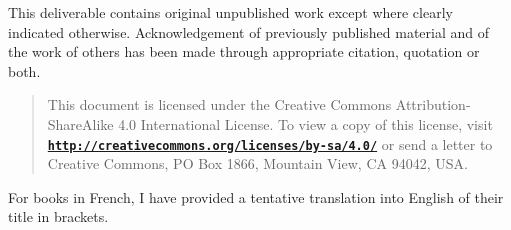 \documentclass[11pt,a4paper]{article}
\newcommand{\bmurl}[1]{{\href{#1}{\texttt{\textbf{#1}}}}}
\begin{document}
This deliverable contains original unpublished work except where
clearly indicated otherwise. Acknowledgement of previously published
material and of the work of others has been made through appropriate
citation, quotation or both.




\begin{quote}
{\footnotesize {} This document
is licensed under the Creative Commons Attribution-ShareAlike 4.0
International License. To view a copy of this license, visit
\bmurl{http://creativecommons.org/licenses/by-sa/4.0/} or send a letter to
Creative Commons, PO Box 1866, Mountain View, CA 94042, USA.}
\end{quote}

\newpage

\tableofcontents

\newpage
\listoffigures

\medskip

\listoftables

\newpage



\newpage



\newpage



\newpage


\newpage



\begin{flushright}
  \begin{relsize}{-2}
    For books in French, I have provided a tentative translation into
    English of their title in brackets.
  \end{relsize}
\end{flushright}

\clearpage

\printindex
\end{document}
